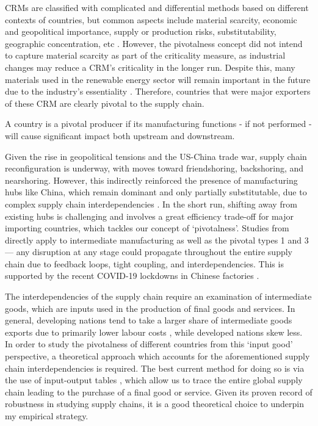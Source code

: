 \documentclass[11pt]{article}
\def\highlight#1#2{
	\begin{centering}
    
		\vspace{1.2ex}
		\begin{minipage}{0.8\linewidth}
			\begin{tcolorbox}[
				boxsep=3.3pt,
				boxrule=0.4pt,
				colback=white,
				colbacktitle=white,
				coltitle=black,
				colframe=black,
				title=\centering \textbf{#1},
			]
				\centering
				#2
			\end{tcolorbox}
		\end{minipage}
		\vspace{1.2ex}
        
	\end{centering}
}
\begin{document}
CRMs are classified with complicated and differential methods based on different contexts of countries, but common aspects include material scarcity, economic and geopolitical importance, supply or production risks, substitutability, geographic concentration, etc \citep{mancini2016}. However, the pivotalness concept did not intend to capture material scarcity as part of the criticality measure, as industrial changes may reduce a CRM’s criticality in the longer run. Despite this, many materials used in the renewable energy sector will remain important in the future due to the industry's essentiality \citep{kowalski2023}. Therefore, countries that were major exporters of these CRM are clearly pivotal to the supply chain.  

\highlight{Pivotal Type 2: Production}{A country is a pivotal producer if its manufacturing functions - if not performed - will cause significant impact both upstream and downstream.}

Given the rise in geopolitical tensions and the US-China trade war, supply chain reconfiguration is underway, with moves toward friendshoring, backshoring, and nearshoring. However, this indirectly reinforced the presence of manufacturing hubs like China, which remain dominant and only partially substitutable, due to complex supply chain interdependencies \citep{alfaro2023}. In the short run, shifting away from existing hubs is challenging and involves a great efficiency trade-off for major importing countries, which tackles our concept of ‘pivotalness’. Studies from \citet{scheibe2018} directly apply to intermediate manufacturing as well as the pivotal types 1 and 3 — any disruption at any stage could propagate throughout the entire supply chain due to feedback loops, tight coupling, and interdependencies. This is supported by the recent COVID-19 lockdowns in Chinese factories \citep{lafrogne2022}.

The interdependencies of the supply chain require an examination of intermediate goods, which are inputs used in the production of final goods and services. In general, developing nations tend to take a larger share of intermediate goods exports due to primarily lower labour costs \citep{lazard2023supplychains}, while developed nations skew less. In order to study the pivotalness of different countries from this ‘input good’ perspective, a theoretical approach which accounts for the aforementioned supply chain interdependencies is required. The best current method for doing so is via the use of input-output tables \citep{leontief1951}, which allow us to trace the entire global supply chain leading to the purchase of a final good or service. Given its proven record of robustness in studying supply chains, it is a good theoretical choice to underpin my empirical strategy.
\end{document}
